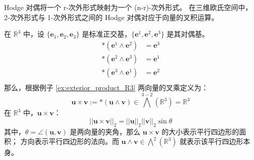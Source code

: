 \begin{note}
    Hodge 对偶将一个 r-次外形式映射为一个 (n-r)-次外形式。
    在三维欧氏空间中，2-次外形式与 1-次外形式之间的 Hodge 对偶对应于向量的叉积运算。
\end{note}

\begin{example}[三维欧氏空间的向量叉积]
    在 $\mathbb{R}^3$ 中，设 $\{\mathbf{e}_1,\mathbf{e}_2,\mathbf{e}_3\}$ 是标准正交基，$\{\mathbf{e}^1,\mathbf{e}^2,\mathbf{e}^3\}$ 是其对偶基。
    \begin{align*}
        *(\mathbf{e}^1\wedge \mathbf{e}^2) &= \mathbf{e}^3 \\
        *(\mathbf{e}^2\wedge \mathbf{e}^3) &= \mathbf{e}^1 \\
        *(\mathbf{e}^3\wedge \mathbf{e}^1) &= \mathbf{e}^2 \\
    \end{align*}
    那么，根据例子 \ref{ex:exterior_product_R3} 两向量的叉乘定义为：
    \[
        \mathbf{u} \times \mathbf{v} := *( \mathbf{u} \wedge \mathbf{v} ) \in \bigwedge^{3-2}(\mathbb{R}^3) = \mathbb{R}^3
    \]
    在 $\mathbb{R}^3$ 中，$\mathbf{u} \times \mathbf{v}$：
    \[
        ||\mathbf{u} \times \mathbf{v}||_2 = ||\mathbf{u}||_2 ||\mathbf{v}||_2 \sin \theta
    \]
    其中，$\theta = \angle(\mathbf{u}, \mathbf{v})$ 是两向量的夹角，那么 $\mathbf{u} \times \mathbf{v}$ 的大小表示平行四边形的面积；
    方向表示平行四边形的法向。而 $\mathbf{u}\wedge \mathbf{v} \in \bigwedge^2(\mathbb{R}^3)$ 就表示该平行四边形本身。
    \label{ex:cross_product_R3}
\end{example}

